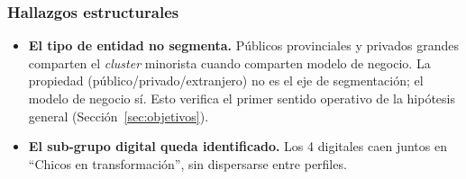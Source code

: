 \documentclass[11pt,a4paper]{article}
\begin{document}
\subsubsection{Hallazgos estructurales}

\begin{itemize}
  \item \textbf{El tipo de entidad no segmenta.} Públicos provinciales y privados grandes comparten el
  \textit{cluster} minorista cuando comparten modelo de negocio. La propiedad (público/privado/extranjero)
  no es el eje de segmentación; el modelo de negocio sí. Esto verifica el primer sentido operativo de la
  hipótesis general (Sección~\ref{sec:objetivos}).
  \item \textbf{El sub-grupo digital queda identificado.} Los 4 digitales caen juntos en ``Chicos en
  transformación'', sin dispersarse entre perfiles.
\end{itemize}
\end{document}
